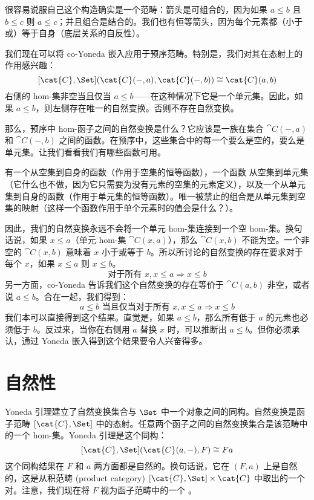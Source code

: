 很容易说服自己这个构造确实是一个范畴：箭头是可组合的，因为如果 $a \leqslant b$ 且 $b \leqslant c$ 则 $a \leqslant c$；并且组合是结合的。我们也有恒等箭头，因为每个元素都（小于或）等于自身（底层关系的自反性）。

我们现在可以将 co-Yoneda 嵌入应用于预序范畴。特别是，我们对其在态射上的作用感兴趣：
\[[\cat{C}, \Set](\cat{C}(-, a), \cat{C}(-, b)) \cong \cat{C}(a, b)\]
右侧的 hom-集非空当且仅当 $a \leqslant b$——在这种情况下它是一个单元集。因此，如果 $a \leqslant b$，则左侧存在唯一的自然变换。否则不存在自然变换。

那么，预序中 hom-函子之间的自然变换是什么？它应该是一族在集合 $\cat{C}(-, a)$ 和 $\cat{C}(-, b)$ 之间的函数。在预序中，这些集合中的每一个要么是空的，要么是单元集。让我们看看我们有哪些函数可用。

有一个从空集到自身的函数（作用于空集的恒等函数），一个函数  从空集到单元集（它什么也不做，因为它只需要为没有元素的空集的元素定义），以及一个从单元集到自身的函数（作用于单元集的恒等函数）。唯一被禁止的组合是从单元集到空集的映射（这样一个函数作用于单个元素时的值会是什么？）。

因此，我们的自然变换永远不会将一个单元 hom-集连接到一个空 hom-集。换句话说，如果 $x \leqslant a$（单元 hom-集 $\cat{C}(x, a)$），那么 $\cat{C}(x, b)$ 不能为空。一个非空的 $\cat{C}(x, b)$ 意味着 $x$ 小于或等于 $b$。所以所讨论的自然变换的存在要求对于每个 $x$，如果 $x \leqslant a$ 则 $x \leqslant b$。
\[\text{对于所有 } x, x \leqslant a \Rightarrow x \leqslant b\]
另一方面，co-Yoneda 告诉我们这个自然变换的存在等价于 $\cat{C}(a, b)$ 非空，或者说 $a \leqslant b$。合在一起，我们得到：
\[a \leqslant b \text{ 当且仅当对于所有 } x, x \leqslant a \Rightarrow x \leqslant b\]
我们本可以直接得到这个结果。直觉是，如果 $a \leqslant b$，那么所有低于 $a$ 的元素也必须低于 $b$。反过来，当你在右侧用 $a$ 替换 $x$ 时，可以推断出 $a \leqslant b$。但你必须承认，通过 Yoneda 嵌入得到这个结果要令人兴奋得多。

\section{自然性}

Yoneda 引理建立了自然变换集合与 $\Set$ 中一个对象之间的同构。自然变换是函子范畴 $[\cat{C}, \Set]$ 中的态射。任意两个函子之间的自然变换集合是该范畴中的一个 hom-集。Yoneda 引理是这个同构：
\[[\cat{C}, \Set](\cat{C}(a, -), F) \cong F a\]
这个同构结果在 $F$ 和 $a$ 两方面都是自然的。换句话说，它在 $(F, a)$ 上是自然的，这是从积范畴 (product category) $[\cat{C}, \Set] \times \cat{C}$ 中取出的一个对。注意，我们现在将 $F$ 视为函子范畴中的一个 。

